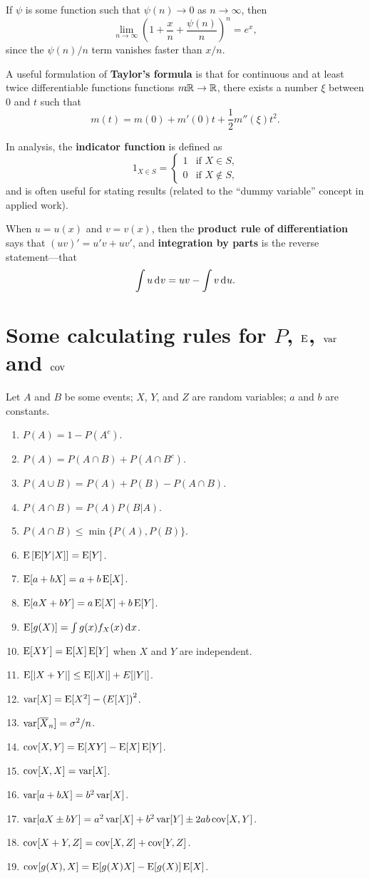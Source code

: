 \documentclass[twoside]{article}
\begin{document}
If $\psi$ is some function such that $\psi(n) \rightarrow 0$ as $n\rightarrow\infty$,
then \[ \lim_{n\rightarrow\infty} \left(1 + \frac{x}{n} + \frac{\psi(n)}{n}  \right)^n = e^x,\]
since the $\psi(n)/n$ term vanishes faster than $x/n$.

A useful formulation of \textbf{Taylor's formula} is that for continuous and at
least twice differentiable functions functions $m\!\!\!:\!\!\mathbb{R} \rightarrow \mathbb{R}$, there
exists a number $\xi$ between $0$ and $t$ such that \[ m(t) = m(0) + m'(0) t +
\frac{1}{2} m''(\xi) t^2.\]

In analysis, the \textbf{indicator function} is defined as 
\[ 1_{X\in S} = \begin{cases} 1 & \text{if $X\in S$,} \\ 0 & \text{if $X\notin S$,}\end{cases}\]
and is often useful for stating results (related to the ``dummy variable'' concept in applied work).

When $u=u(x)$ and $v=v(x)$, then the \textbf{product rule of differentiation}
says that $(u v)' = u'v + u v'$,  and \textbf{integration by parts} is the reverse statement---that
\[\int u \rd v = u v - \int v \rd u. \]

\section{Some calculating rules for $P$, $\operatorname{E}$, $\operatorname{var}$ and $\operatorname{cov}$}
Let $A$ and $B$ be some events; $X$, $Y$, and $Z$ are random variables; $a$ and $b$
are constants.
\begin{enumerate}
\item $P(A) = 1 - P(A^c)$.
\item $P(A) = P(A\cap B) + P(A\cap B^c)$.
\item $P(A\cup B) = P(A) + P(B) - P(A\cap B)$.
\item $P(A \cap B) = P(A)P(B|A)$.
\item $P(A\cap B) \leq \min\{P(A), P(B)\}$.
\item $\operatorname{E}\left[\operatorname{E}[Y|X]\right] = \operatorname{E}[Y]$.
\item $\operatorname{E}[a + bX ] = a + b\operatorname{E}[X]$.
\item $\operatorname{E}[a X + b Y] = a\operatorname{E}[X] + b\operatorname{E}[Y]$.
\item $\E[g(X)] = \int g(x) f_X(x) \rd x$.
\item $\operatorname{E}[XY] = \operatorname{E}[X]\operatorname{E}[Y]$ when $X$ and $Y$ are independent.
\item $\operatorname{E}[|X+Y|] \leq \operatorname{E}[|X|] + E[|Y|]$.
\item $\operatorname{var}[X] = \operatorname{E}[X^2] - \left(E[X]\right)^2$.
\item $\operatorname{var}[\overline{X}_n] = \sigma^2 / n$.
\item $\operatorname{cov}[X,Y] = \operatorname{E}[XY] - \operatorname{E}[X]\operatorname{E}[Y]$.
\item $\operatorname{cov}[X,X] = \operatorname{var}[X]$.
\item $\operatorname{var}[a + bX] = b^2 \operatorname{var}[X]$.
\item $\operatorname{var}[a X \pm b Y] = a^2 \operatorname{var}[X] + b^2 \operatorname{var}[Y] \pm 2 a b \operatorname{cov}[X,Y]$.
\item $\operatorname{cov}[X+Y,Z] =  \operatorname{cov}[X,Z] + \operatorname{cov}[Y,Z]$.
\item $\operatorname{cov}[g(X),X] = \operatorname{E}[g(X)X]  - \operatorname{E}[g(X)]\operatorname{E}[X]$.
\end{enumerate}
\end{document}

